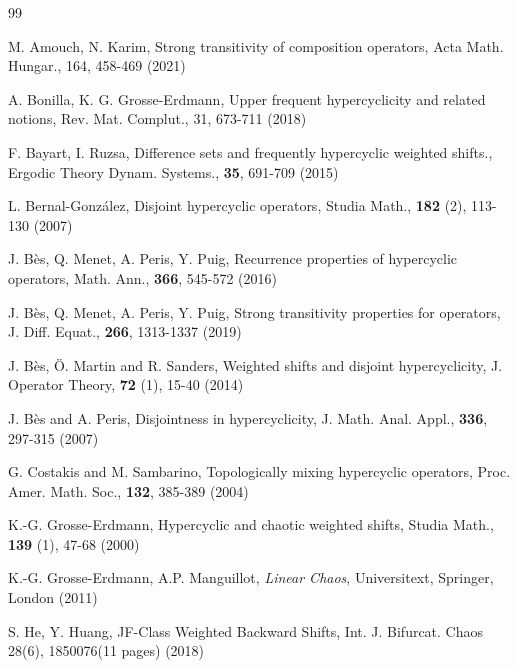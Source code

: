 \documentclass{article}
\begin{document}
\begin{thebibliography}{99}

\newblock M. Amouch, N. Karim,
\newblock Strong transitivity of composition operators,
\newblock  Acta Math. Hungar., 164, 458-469 (2021)

\newblock A. Bonilla, K. G. Grosse-Erdmann,
\newblock  Upper frequent hypercyclicity and related notions,
\newblock Rev. Mat. Complut., 31, 673-711 (2018)



\newblock F. Bayart, I. Ruzsa,
\newblock Difference sets and frequently hypercyclic weighted shifts.,
\newblock Ergodic Theory Dynam. Systems., \textbf{35}, 691-709 (2015)

\newblock L. Bernal-Gonz\'{a}lez,
\newblock Disjoint hypercyclic operators,
\newblock Studia Math., \textbf{182} (2), 113-130 (2007)

\newblock J. B\`{e}s, Q. Menet, A. Peris, Y. Puig,
\newblock Recurrence properties of hypercyclic operators,
\newblock Math. Ann., \textbf{366}, 545-572 (2016)

\newblock J. B\`{e}s, Q. Menet, A. Peris, Y. Puig,
\newblock Strong transitivity properties for operators,
\newblock J. Diff. Equat., \textbf{266}, 1313-1337 (2019)


\newblock J. B\`{e}s, \"{O}. Martin and R. Sanders,
\newblock Weighted shifts and disjoint hypercyclicity,
\newblock  J. Operator Theory, \textbf{72} (1), 15-40 (2014)

\newblock J. B\`{e}s and A. Peris,
\newblock Disjointness in hypercyclicity,
\newblock J. Math. Anal. Appl., \textbf{336}, 297-315 (2007)


\newblock G. Costakis and M. Sambarino,
\newblock Topologically mixing hypercyclic operators,
\newblock Proc. Amer. Math. Soc., \textbf{132}, 385-389 (2004)

\newblock K.-G. Grosse-Erdmann,
\newblock Hypercyclic and chaotic weighted shifts,
\newblock Studia Math., \textbf{139} (1), 47-68 (2000)

\newblock K.-G. Grosse-Erdmann, A.P. Manguillot,
\newblock \emph{Linear Chaos},
\newblock Universitext, Springer, London (2011)

\newblock S. He, Y. Huang,
\newblock JF-Class Weighted Backward Shifts,
\newblock Int. J. Bifurcat. Chaos 28(6), 1850076(11 pages) (2018)



\end{thebibliography}
\end{document}
